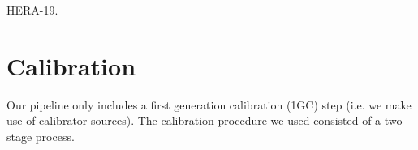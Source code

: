 \documentclass[a0,portrait]{a0poster}
\begin{document}
\begin{multicols}{2}
\begin{minipage}{\columnwidth}
    \makeatletter
    \newcommand{\@captype}{figure}
    \makeatother
    \centering
    \qquad%
    \caption{\color{Green} HERA-19.}
  \end{minipage}


\section*{Calibration}

Our pipeline only includes a first generation calibration (1GC) step (i.e. we make use of calibrator sources).
The calibration procedure we used consisted of a two stage process.


\end{multicols}
\end{document}
